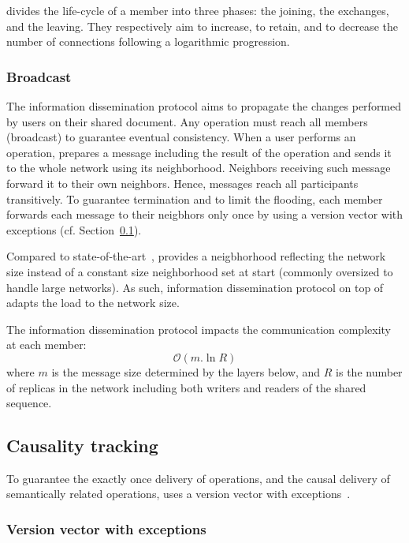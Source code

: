 \SPRAY divides the life-cycle of a member into three phases: the joining, the
exchanges, and the leaving. They respectively aim to increase, to retain, and
to decrease the number of connections following a logarithmic progression.

\subsubsection{Broadcast}

The information dissemination protocol\cite{birman1999bimodal} aims to propagate
the changes performed by users on their shared document. Any operation must
reach all members (broadcast) to guarantee eventual consistency.  When a user
performs an operation, \CRATE prepares a message including the result of the
operation and sends it to the whole network using its neighborhood. Neighbors
receiving such message forward it to their own neighbors. Hence, messages reach
all participants transitively. To guarantee termination and to limit the
flooding, each member forwards each message to their neigbhors only once by
using a version vector with exceptions (cf. Section~\ref{subsec:causality}).

Compared to state-of-the-art~\cite{ganesh2003peer, jelasity2007gossip,
  voulgaris2005cyclon}, \SPRAY provides a neigbhorhood reflecting the network
size instead of a constant size neighborhood set at start (commonly oversized to
handle large networks). As such, information dissemination protocol on top of
\SPRAY adapts the load to the network size.

The information dissemination protocol impacts the communication complexity at
each member:
\begin{equation}
  \mathcal{O}(m.\ln R)
\end{equation}
where $m$ is the message size determined by the layers below, and
$R$ is the number of replicas in the network including both
writers and readers of the shared sequence.


\subsection{Causality tracking}
\label{subsec:causality}

To guarantee the exactly once delivery of operations, and the causal delivery of
semantically related operations, \CRATE uses a version vector with
exceptions~\cite{malkhi2007concise, mukund2014optimized}.

\subsubsection{Version vector with exceptions}

